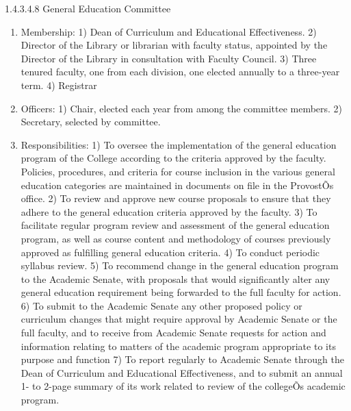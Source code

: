 \documentclass[letterpaper, 11pt]{article}
\begin{document}
				1.4.3.4.8 General Education Committee
				\begin{enumerate}[label=\alph*)]
					\item{Membership:}
					1) Dean of Curriculum and Educational Effectiveness.
					2) Director of the Library or librarian with faculty status, appointed by the Director of the Library in consultation with Faculty Council.
					3) Three tenured faculty, one from each division, one elected annually to a three-year term.
					4) Registrar
					\item{Officers:}
					1) Chair, elected each year from among the committee members.
					2) Secretary, selected by committee.
					\item{Responsibilities:}
					1) To oversee the implementation of the general education program of the College according to the criteria approved by the faculty.  Policies, procedures, and criteria for course inclusion in the various general education categories are maintained in documents on file in the ProvostÕs office.
					2) To review and approve new course proposals to ensure that they adhere to the general education criteria approved by the faculty.
					3) To facilitate regular program review and assessment of the general education program, as well as course content and methodology of courses previously approved as fulfilling general education criteria.
					4) To conduct periodic syllabus review.
					5) To recommend change in the general education program to the Academic Senate, with proposals that would significantly alter any general education requirement being forwarded to the full faculty for action.
					6) To submit to the Academic Senate any other proposed policy or curriculum changes that might require approval by Academic Senate or the full faculty, and to receive from Academic Senate requests for action and information relating to matters of the academic program appropriate to its purpose and function
					7) To report regularly to Academic Senate through the Dean of Curriculum and Educational Effectiveness, and to submit an annual 1- to 2-page summary of its work related to review of the collegeÕs academic program.
				\end{enumerate}
\end{document}
